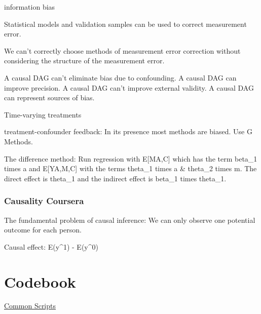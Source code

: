 \documentclass[]{book}
\begin{document}
information bias

Statistical models and validation samples can be used to correct measurement error.

We can't correctly choose methods of measurement error correction without considering the structure of the measurement error.

A causal DAG can't eliminate bias due to confounding. A causal DAG can improve precision. A causal DAG can't improve external validity. A causal DAG can represent sources of bias.

Time-varying treatments

treatment-confounder feedback: In its presence most methods are biased. Use G Methods.

The difference method: Run regression with E{[}M\textbar{}A,C{]} which has the term beta\_1 times a and E{[}Y\textbar{}A,M,C{]} with the terms theta\_1 times a \& theta\_2 times m. The direct effect is theta\_1 and the indirect effect is beta\_1 times theta\_1.

\hypertarget{causality-coursera}{%
\subsection{Causality Coursera}\label{causality-coursera}}

The fundamental problem of causal inference: We can only observe one potential outcome for each person.

Causal effect: E(y\^{}1) - E(y\^{}0)

\hypertarget{codebook}{%
\chapter{Codebook}\label{codebook}}

\href{http://chrisalbon.com/}{Common Scripts}
\end{document}
